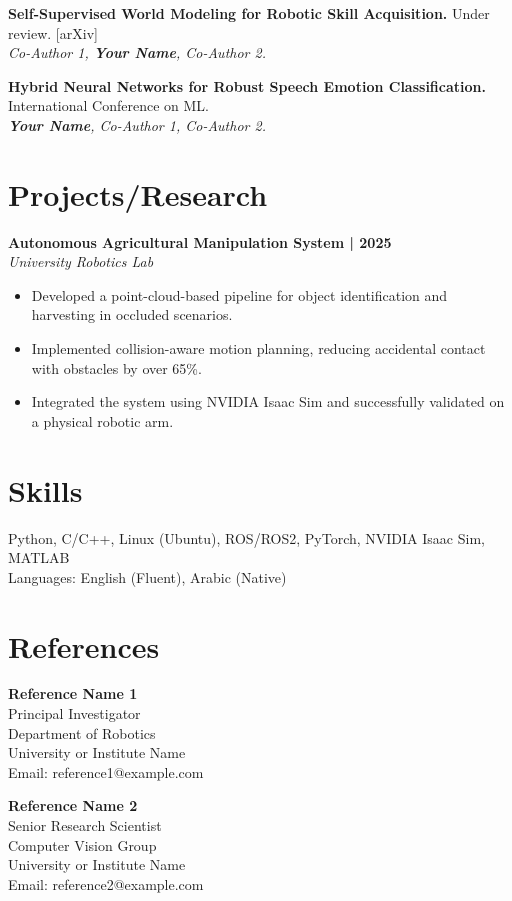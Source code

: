\documentclass[11pt,a4paper]{article}
\newcommand{\blueitem}[1]{\textcolor{subtitleblue}{\textbf{#1}}}
\begin{document}
\blueitem{Self-Supervised World Modeling for Robotic Skill Acquisition.} Under review. [arXiv] \\
\textit{Co-Author 1, \textbf{Your Name}, Co-Author 2.}

\vspace{0.2em}

\blueitem{Hybrid Neural Networks for Robust Speech Emotion Classification.} International Conference on ML. \\
\textit{\textbf{Your Name}, Co-Author 1, Co-Author 2.}

\section*{Projects/Research}

\blueitem{Autonomous Agricultural Manipulation System | 2025} \\
\textit{University Robotics Lab}
\begin{itemize}
    \item Developed a point-cloud-based pipeline for object identification and harvesting in occluded scenarios.
    \item Implemented collision-aware motion planning, reducing accidental contact with obstacles by over 65\%.
    \item Integrated the system using NVIDIA Isaac Sim and successfully validated on a physical robotic arm.
\end{itemize}

\section*{Skills}
Python, C/C++, Linux (Ubuntu), ROS/ROS2, PyTorch, NVIDIA Isaac Sim, MATLAB \\
Languages: English (Fluent), Arabic (Native)

\section*{References}

\begin{minipage}[t]{0.48\textwidth}
    \textbf{Reference Name 1} \\
    Principal Investigator \\
    Department of Robotics \\
    University or Institute Name \\
    Email: reference1@example.com
\end{minipage}%
\hfill
\begin{minipage}[t]{0.48\textwidth}
    \textbf{Reference Name 2} \\
    Senior Research Scientist \\
    Computer Vision Group \\
    University or Institute Name \\
    Email: reference2@example.com
\end{minipage}
\end{document}
